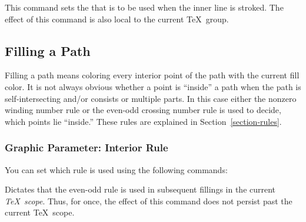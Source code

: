 \begin{command}{\pgfsetinnerstrokecolor{}}
  This command sets the  that is to be used when the inner
  line is stroked. The effect of this command is also local to the
  current \TeX\ group.

\begin{codeexample}[]
\begin{pgfpicture}
  \pgfpathmoveto{\pgfpointorigin}
  \pgfpathlineto{\pgfpoint{1cm}{1cm}}
  \pgfpathlineto{\pgfpoint{1cm}{0cm}}
  \pgfsetlinewidth{2pt}
  \pgfsetinnerlinewidth{1pt}
\end{pgfpicture}
\end{codeexample}  
\end{command}


\subsection{Filling a Path}
\label{section-fill}

Filling a path means coloring every interior point of the path with
the current fill color. It is not always obvious whether a point is
``inside'' a  path when the path is self-intersecting and/or consists
or multiple parts. In this case either the nonzero winding number rule
or the even-odd crossing number rule is used to decide, which points
lie ``inside.'' These rules are explained in
Section~\ref{section-rules}. 

\subsubsection{Graphic Parameter: Interior Rule}

You can set which rule is used using the following commands:

\begin{command}{\pgfseteorule}
  Dictates that the even-odd rule is used in subsequent fillings in
  the current \emph{\TeX\ scope}. Thus, for once, the effect of this
  command does not persist past the current \TeX\ scope.

\begin{codeexample}[]
\begin{pgfpicture}
  \pgfseteorule
  \pgfpathcircle{\pgfpoint{0mm}{0cm}}{7mm}
  \pgfpathcircle{\pgfpoint{5mm}{0cm}}{7mm}
\end{pgfpicture}
\end{codeexample}
\end{command}

